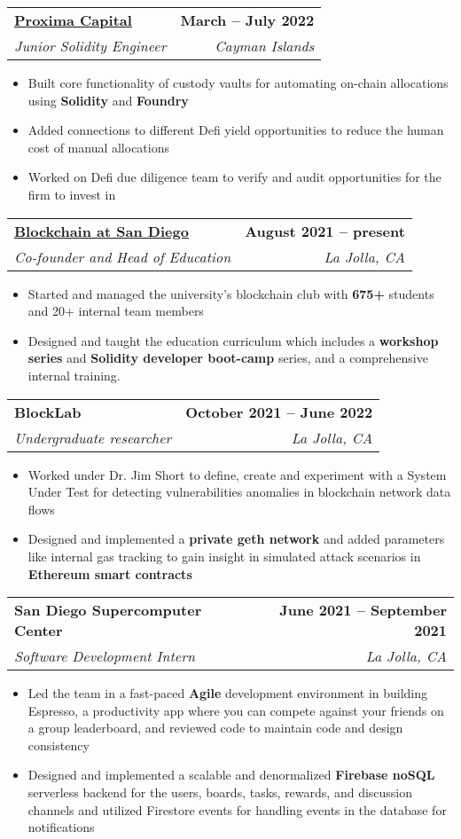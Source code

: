 \documentclass[letterpaper,11pt]{article}
\makeatletter
\newcommand{\resumeItem}[1]{
  \item\small{
    {#1 \vspace{-2pt}}
  }
}
\newcommand{\resumeSubheading}[4]{
  \vspace{-2pt}\item
    \begin{tabular*}{1.0\textwidth}[t]{l@{\extracolsep{\fill}}r}
      \textbf{#1} & \textbf{\small #2} \\
      \textit{\small#3} & \textit{\small #4} \\
    \end{tabular*}\vspace{-7pt}
}
\newcommand{\resumeItemListStart}{\begin{itemize}}
\newcommand{\resumeItemListEnd}{\end{itemize}\vspace{-5pt}}
\makeatother
\begin{document}
  \resumeSubheading
      {\href{https://github.com/proximacapital}{Proxima Capital}}{March -- July 2022}
      {Junior Solidity Engineer}{Cayman Islands}
      \resumeItemListStart
        \resumeItem{Built core functionality of custody vaults for automating on-chain allocations using \textbf{Solidity} and \textbf{Foundry}}
        \resumeItem{Added connections to different Defi yield opportunities to reduce the human cost of manual allocations}
        \resumeItem{Worked on Defi due diligence team to verify and audit opportunities for the firm to invest in}
      \resumeItemListEnd

   \resumeSubheading
      {\href{https://blockchainatsd.xyz/}{Blockchain at San Diego}}{August 2021 -- present}
      {Co-founder and Head of Education}{La Jolla, CA}
      \resumeItemListStart
        \resumeItem{Started and managed the university's blockchain club with \textbf{675+} students and 20+ internal team members}
        \resumeItem{Designed and taught the education curriculum which includes a \textbf{workshop series} and \textbf{Solidity developer boot-camp} series, and a comprehensive internal training.}
      \resumeItemListEnd

  \resumeSubheading
      {BlockLab}{October 2021 -- June 2022}
      {Undergraduate researcher}{La Jolla, CA}
      \resumeItemListStart
        \resumeItem{Worked under Dr. Jim Short to define, create and experiment with a System Under Test for detecting vulnerabilities anomalies in blockchain network data flows}
        \resumeItem{Designed and implemented a \textbf{private geth network} and added parameters like internal gas tracking to gain insight in simulated attack scenarios in \textbf{Ethereum smart contracts}}
      \resumeItemListEnd



  \resumeSubheading
      {San Diego Supercomputer Center}{June 2021 -- September 2021}
      {Software Development Intern}{La Jolla, CA}
      \resumeItemListStart
        \resumeItem{Led the team in a fast-paced \textbf{Agile} development environment in building Espresso, a productivity app where you can compete against your friends on a group leaderboard, and reviewed code to maintain code and design consistency}
        \resumeItem{Designed and implemented a scalable and denormalized \textbf{Firebase noSQL} serverless backend for the users, boards, tasks, rewards, and discussion channels and utilized Firestore events for handling events in the database for notifications}
      \resumeItemListEnd
\end{document}
